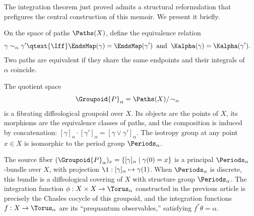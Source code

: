 \begin{article}
  \label{art:groupoid-closed-1-form}
  The integration theorem just proved admits a structural reformulation
  that prefigures the central construction of this memoir.
  We present it briefly.
  
  On the space of paths $\Paths(X)$,
  define the equivalence relation
  \[
    \gamma \sim_\alpha \gamma'
    \qtext{\Iff}
    \EndsMap(\gamma) = \EndsMap(\gamma')
    \;\;\text{and}\;\;
    \Kalpha(\gamma) = \Kalpha(\gamma').
    \]%
  Two paths are equivalent if they share the same endpoints
  and their integrals of $\alpha$ coincide.
  
  \begin{proposition}
    The quotient space
    \[
      \Groupoid{P}_\alpha = \Paths(X)/\!\sim_\alpha
      \]%
    is a fibrating diffeological groupoid over $X$.
    Its objects are the points of $X$,
    its morphisms are the equivalence classes of paths,
    and the composition is induced by concatenation:
    $[\gamma]_\alpha \cdot [\gamma']_\alpha = [\gamma \vee \gamma']_\alpha$.
    The isotropy group at any point $x \in X$ is isomorphic to the
    period group $\Periods_\alpha$.
  \end{proposition}
  
  The source fiber $(\Groupoid{P}_\alpha)_x = \{ [\gamma]_\alpha \mid \gamma(0) = x \}$
  is a principal $\Periods_\alpha$-bundle over $X$,
  with projection $\1: [\gamma]_\alpha \mapsto \gamma(1)$.
  When $\Periods_\alpha$ is discrete,
  this bundle is a diffeological covering of $X$ with structure group
  $\Periods_\alpha$.
  The integration function $\phi: X \times X \to \Torus_\alpha$ constructed
  in the previous article is precisely the Chasles cocycle of this groupoid,
  and the integration functions $f: X \to \Torus_\alpha$ are its
  ``prequantum observables,''
  satisfying $f^*\theta = \alpha$.
  

\end{article}
